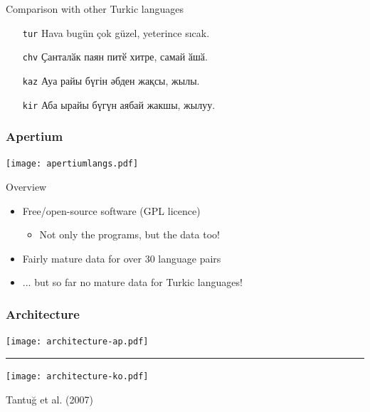 \documentclass[10pt,xetex]{beamer} %
\begin{document}
\begin{frame}
\begin{onlyenv}
	\begin{block}{Comparison with other Turkic languages}
		\begin{itemize}
			\item[{\small {\tt tur}}] Hava bugün çok güzel, yeterince sıcak. \\
			{}
			\item[{\small {\tt chv}}] Ҫанталӑк паян питӗ хитре, самай ӑшӑ. \\
			{}
			\item[{\small {\tt kaz}}] Ауа райы бүгін әбден жақсы, жылы. \\
			{}
			\item[{\small {\tt kir}}] Аба ырайы бүгүн аябай жакшы, жылуу. \\
			{}
		\end{itemize}
	\end{block}
  
  \end{onlyenv}
  
\end{frame}

\begin{frame}
  \frametitle{Apertium}

\begin{center}
  \texttt{[image: apertiumlangs.pdf]}%
\end{center}

\begin{block}{Overview}
  
  \begin{itemize}
    \item Free/open-source software (GPL licence)
    \begin{itemize}
      \item Not only the programs, but the data too!
    \end{itemize}
    \item Fairly mature data for over 30 language pairs
    \item ... but so far no mature data for Turkic languages!
  \end{itemize}
  
\end{block}


\end{frame}

\begin{frame}
  \frametitle{Architecture}

\texttt{[image: architecture-ap.pdf]} 
\vspace{1em}
\hrule
\vspace{1em}
\texttt{[image: architecture-ko.pdf]} 
\begin{flushright}
{\tiny Tantuğ et al. (2007)}
\end{flushright}

\end{frame}
\end{document}
